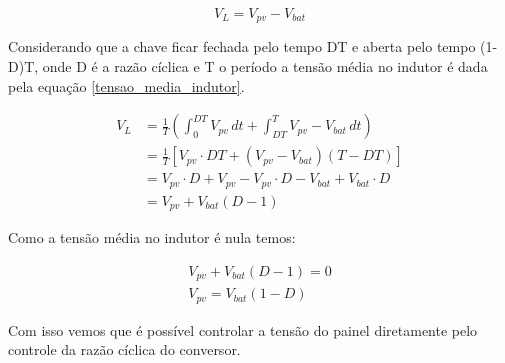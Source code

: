 \begin{equation} \label{tensao_indutor_segunda_etapa}
V_{L} = V_{pv} - V_{bat}
\end{equation}

Considerando que a chave ficar fechada pelo tempo DT e aberta pelo tempo (1-D)T, onde D é a razão cíclica e T o período a tensão média no indutor é dada pela equação \ref{tensao_media_indutor}.

\begin{equation} \label{tensao_media_indutor}
\begin{aligned}
V_{L} &= \frac{1}{T}\left(\int_{0}^{DT} V_{pv}\,dt + \int_{DT}^{T} V_{pv} - V_{bat}\,dt\right) \\
&= \frac{1}{T}\left[V_{pv}\cdot DT + (V_{pv}-V_{bat})(T-DT)\right] \\
&= V_{pv}\cdot D + V_{pv} - V_{pv}\cdot D - V_{bat} +V_{bat}\cdot D \\
&= V_{pv} + V_{bat}(D-1)
\end{aligned}
\end{equation}

Como a tensão média no indutor é nula temos:

\begin{equation}
\begin{gathered}
V_{pv} + V_{bat}(D-1) = 0 \\
V_{pv} = V_{bat}(1-D) 
\end{gathered}
\end{equation}

Com isso vemos que é possível controlar a tensão do painel diretamente pelo controle da razão cíclica do conversor.